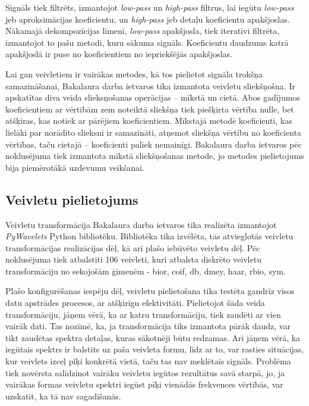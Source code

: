 Signāls tiek filtrēts, izmantojot \textit{low-pass} un \textit{high-pass} filtrus, lai iegūtu \textit{low-pass} jeb aproksimācijas koeficientu, un \textit{high-pass} jeb detaļu koeficientu apakšjoslas. Nākamajā dekompozīcijas līmenī, \textit{low-pass} apakšjosla, tiek iteratīvi filtrēta, izmantojot to pašu metodi, kuru sākuma signāls. Koeficientu daudzums katrā apakšjoslā ir puse no koeficientiem no iepriekšējās apakšjoslas. 


Lai gan veivletiem ir vairākas metodes, kā tos pielietot signāla trokšņa samazināšanai, Bakalaura darba ietvaros tika izmantota veivletu sliekšņošna. Ir apskatītas diva veida slieksņošanas operācijas – mīkstā un cietā. Abos gadījumos koeficientiem ar vērtībām zem noteiktā sliekšņa tiek piešķirta vērtība nulle, bet atšķiras, kas notiek ar pārējiem koeficientiem. Mīkstajā metodē koeficienti, kas lielāki par norādīto slieksni ir samazināti, atņemot sliekšņa vērtību no koeficienta vērtības, taču cietajā – koeficienti paliek nemainīgi. Bakalaura darba ietvaros pēc noklusējuma tiek izmantota mīkstā sliekšņošanas metode, jo metodes pielietojums bija piemērotākā uzdevumu veikšanai.




\subsection{Veivletu pielietojums}

Veivletu transformācija Bakalaura darba ietvaros tika realizēta izmantojot \textit{PyWavelets} \cite{pywt} Python bibliotēku. Bibliotēka tika izvēlēta, tās atvieglotās veivletu transformācijas realizācijas dēļ, kā arī plašo iebūvēto veivletu dēļ. Pēc noklusējuma tiek atbalstīti 106 veivleti, kuri atbalsta diskrēto veivletu transformāciju no sekojošām ģimenēm - bior, coif, db, dmey, haar, rbio, sym.

Plašo konfigurēšanas iespēju dēļ, veivletu pielietošana tika testēta gandrīz visos datu apstrādes procesos, ar atšķirīgu efektivitāti. Pielietojot šāda veida transformāciju, jāņem vērā, ka ar katru transformāciju, tiek zaudēti ar vien vairāk dati. Tas nozīmē, ka, ja transformācija tiks izmantota pārāk daudz, var tikt zaudētas spektra detaļas, kuras sākotnēji būtu redzamas. Arī jāņem vērā, ka iegūtais spektrs ir balstīts uz paša veivleta formu, līdz ar to, var rasties situācijas, kur veivlets izceļ pīķi konkrētā vietā, taču tas nav meklētais signāls. Problēma tiek novērsta salīdzinot vairāku veivletu iegūtos rezultātus savā starpā, jo, ja vairākas formas veivletu spektri iegūst pīķi vienādās frekvences vērtībās, var uzskatīt, ka tā nav sagadīšanās.

